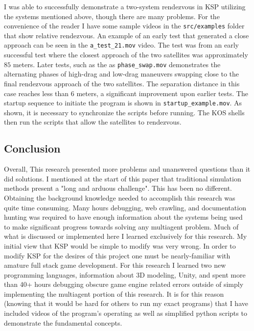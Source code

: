 \documentclass[journal,a4paper,12pt]{IEEEtran}
\begin{document}
I was able to successfully demonstrate a two-system rendezvous in KSP utilizing
the systems mentioned above, though there are many problems. For the convenience of the
reader I have some sample videos in the \texttt{src/examples} folder that show
relative rendezvous. An example of an early test that generated a close approach
can be seen in the \texttt{a\_test\_21.mov} video. The test was from an early
successful test where the closest approach of the two satellites was approximately
$85$ meters. Later tests, such as the as \texttt{phase\_swap.mov} demonstrates the
alternating phases of high-drag and low-drag maneuvers swapping close to the final
rendezvous approach of the two satellites. The separation distance in this case
reaches less than $6$ meters, a significant improvement upon earlier tests. The
startup sequence to initiate the program is shown in \texttt{startup\_example.mov}.
As shown, it is necessary to synchronize the scripts before running. The KOS shells
then run the scripts that allow the satellites to rendezvous.




\subsection{Conclusion}
Overall, This research presented more problems and unanswered questions than it did solutions.
I mentioned at the start of this paper that traditional simulation methods present a
"long and arduous challenge". This has been no different.
Obtaining the background knowledge needed to accomplish this research was quite
time consuming. Many hours debugging, web crawling, and documentation hunting
was required to have enough information about the systems being used to make significant
progress towards solving any multiagent problem. Much of what is
discussed or implemented here I learned exclusively for this research. My initial
view that KSP would be simple to modify was very wrong. In order to modify KSP for
the desires of this project one must be nearly-familiar with amature full stack
game development. For this research I learned two new programming languages, information
about 3D modeling, Unity, and spent more than
40+ hours debugging obscure game engine related errors outside of simply implementing
the multiagent portion of this research. It is for this reason (knowing that it would be hard for others to
run my exact programs) that I have included videos of the program's operating as well
as simplified python scripts to demonstrate the fundamental concepts.
\end{document}
